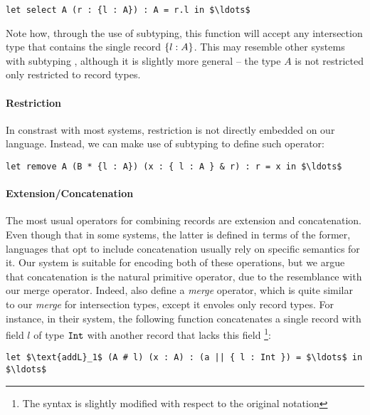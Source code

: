 \begin{lstlisting}[mathescape=true]
let select A (r : {l : A}) : A = r.l in $\ldots$ 
\end{lstlisting}

Note how, through the use of subtyping, this function will accept any intersection type that 
contains the single record $\{ l : A \}$.
This may resemble other systems with subtyping \cite{cardelli1990operations,pierce1994simple}, 
although it is slightly more general -- the type $A$ is not restricted only  
restricted to record types. 

\paragraph{Restriction}

In constrast with most systems, restriction is not directly embedded on our language.
Instead, we can make use of subtyping to define such operator: 
%
\begin{lstlisting}[mathescape=true]
let remove A (B * {l : A}) (x : { l : A } & r) : r = x in $\ldots$ 
\end{lstlisting}

\paragraph{Extension/Concatenation}
The most usual operators for combining records are extension and concatenation.
Even though that in some systems, the latter is defined in terms of the former, languages that
opt to include concatenation usually rely on specific semantics for it. 
Our system is suitable for encoding both of these operations, but we argue that concatenation is
the natural primitive operator, due to the resemblance with our merge operator.
Indeed, \cite{harper1991record} also define a \emph{merge} operator, which is quite similar to
our \emph{merge} for intersection types, except it envoles only record types.
For instance, in their system, the following function concatenates a single record with field $l$ 
of type $\texttt{Int}$ with another record that lacks this field \footnote{The syntax is slightly modified
with respect to the original notation}:
\begin{lstlisting}[mathescape=true]
let $\text{addL}_1$ (A # l) (x : A) : (a || { l : Int }) = $\ldots$ in $\ldots$ 
\end{lstlisting}

